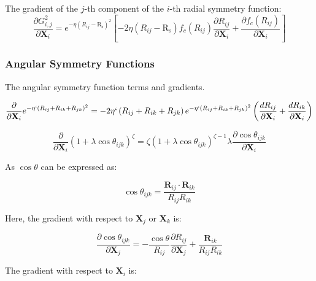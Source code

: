 \documentclass{article}
\newcommand{\mb}[1]{\mathbf{#1}}
\begin{document}
The gradient of the $j$-th component of the $i$-th radial symmetry function:
\begin{equation}\label{eq:rad_derivative}
\frac{\partial G_{i,j}^2 } { \partial \mb{X}_i} = e^{-\eta ( R_{ij} - \mathrm{R_s} )^2} \left[ -2 \eta ( R_{ij} - \mathrm{R_s} )  f_c (R_{ij}) \frac{\partial R_{ij}}{\partial  \mb{X}_i} + \frac{\partial f_c ( R_{ij} )}{\partial \mb{X}_i} \right] 
\end{equation}

\subsubsection{Angular Symmetry Functions}

The angular symmetry function terms and gradients.

\begin{equation}
\frac{\partial } {\partial \mb{X}_i}
 e^{-\eta ` \left( R_{ij} + R_{ik} + R_{jk} \right)^2 } =
  -2 \eta` \left( R_{ij} + R_{ik} + R_{jk} \right) e^{-\eta` \left( R_{ij} + R_{ik} + R_{jk} \right)^2   } \left(
\frac{d R_{ij}}{\partial \mb{X}_i} + \frac{d R_{ik}}{\partial \mb{X}_i} \right)
\end{equation}

\begin{equation}
\frac{\partial } {\partial \mb{X}_i} ( 1 + \lambda \cos{\theta_{ijk}} )^\zeta  = \zeta ( 1 + \lambda \cos \theta_{ijk} ) ^ {\zeta - 1} \lambda\frac{\partial \cos \theta_{ijk} } {\partial \mb{X}_i}
\end{equation}

As $\cos \theta$ can be expressed as:

\begin{equation}
\cos \theta_{ijk} = \frac{\mb{R}_{ij} \cdot  \mb{R}_{ik}} { R_{ij}  R_{ik}}
\end{equation}

Here, the gradient with respect to $\mb{X}_j$ or $\mb{X}_k$ is:

\begin{equation}
\frac{\partial \cos \theta_{ijk} } {\partial \mb{X}_j} = -\frac{\cos{\theta}}{R_{ij}} \frac{\partial R_{ij}}{\partial \mb{X}_j} + \frac{\mb{R}_{ik}}{R_{ij} R_{ik}}
\end{equation}

The gradient with respect to $\mb{X}_i$ is:
\end{document}
